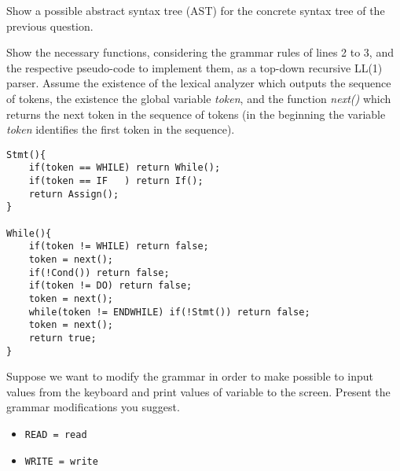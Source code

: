 \documentclass[docid=2017]{comp_test1}
\begin{document}
\question
Show a possible abstract syntax tree (AST) for the concrete syntax tree of the previous question.

\ansseparator

\vspace{-1em}
\begin{center}
    \ttfamily\small
\end{center}

\question
Show the necessary functions, considering the grammar rules of lines 2 to 3, and the respective pseudo-code to implement them, as a top-down recursive LL(1) parser. Assume the existence of the lexical analyzer which outputs the sequence of tokens, the existence the global variable \textit{token}, and the function \textit{next()} which returns the next token in the sequence of tokens (in the beginning the variable \textit{token} identifies the first token in the sequence).

\ansseparator

\begin{lstlisting}
Stmt(){
    if(token == WHILE) return While();
    if(token == IF   ) return If();
    return Assign();
}

While(){
    if(token != WHILE) return false;
    token = next();
    if(!Cond()) return false;
    if(token != DO) return false;
    token = next();
    while(token != ENDWHILE) if(!Stmt()) return false;
    token = next();
    return true;
}
\end{lstlisting}

\question
Suppose we want to modify the grammar in order to make possible to input values from the keyboard and print values of variable to the screen. Present the grammar modifications you suggest.

\ansseparator

\begin{itemize}[wide, noitemsep]
    \item \texttt{READ = read}
    \item \texttt{WRITE = write}
\end{itemize}
\end{document}
